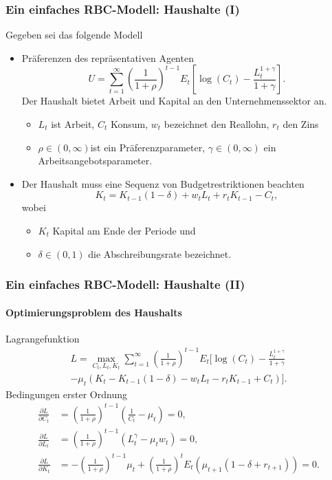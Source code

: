 \documentclass[10pt]{beamer}  %
\begin{document}
\begin{frame}
  \frametitle{Ein einfaches RBC-Modell: Haushalte (I)}
Gegeben sei das folgende Modell
\begin{itemize}
\item Pr\"{a}ferenzen des repr\"{a}sentativen Agenten
\begin{equation*}
U=\sum_{t=1}^{\infty }\left( \frac{1}{1+\rho }\right) ^{t-1}E_{t}\left[ \log
\left( C_{t}\right) -\frac{L_{t}^{1+\gamma }}{1+\gamma }\right] .
\end{equation*}%
Der Haushalt bietet Arbeit und Kapital an den Unternehmenssektor an.
\begin{itemize}
\item $L_{t}$ ist Arbeit, $C_{t}$ Konsum, $w_{t}$ bezeichnet den Reallohn, $r_{t}$ den Zins
\item $\rho \in \left( 0,\infty \right)$ist ein Pr\"{a}ferenzparameter, $\gamma \in \left( 0,\infty \right) $ ein Arbeitsangebotsparameter.
\end{itemize}
\item Der Haushalt muss eine Sequenz von Budgetrestriktionen beachten
\begin{equation*}
K_t=K_{t-1}\left( 1-\delta \right) +w_{t}L_{t}+r_{t}K_{t-1}-C_{t},
\end{equation*}%
wobei
\begin{itemize}
\item $K_{t}$ Kapital am Ende der Periode und
\item $\delta \in \left(
0,1\right) $ die Abschreibungsrate bezeichnet.
\end{itemize}
\end{itemize}
\end{frame}

\begin{frame}\frametitle{Ein einfaches RBC-Modell: Haushalte (II)}
  \framesubtitle{Optimierungsproblem des Haushalts}
  Lagrangefunktion
\begin{multline*}
L = \max_{C_t,L_t,K_t} \sum_{t=1}^\infty \left( \frac{1}{1+\rho }\right) ^{t-1}E_{t}\Big[ \log
\left( C_{t}\right) -\frac{L_{t}^{1+\gamma }}{1+\gamma }\\
-\mu_t\left(K_t-K_{t-1}\left( 1-\delta \right) -w_{t}L_{t}-r_{t}K_{t-1}+C_{t}\right)\Big].
\end{multline*}
Bedingungen erster Ordnung
\begin{align*}
  \frac{\partial L}{\partial C_t} &= \left( \frac{1}{1+\rho }\right) ^{t-1}\left(\frac{1}{C_t}-\mu_t\right) = 0,\\
  \frac{\partial L}{\partial L_t} &= \left( \frac{1}{1+\rho }\right) ^{t-1}\left(L_t^\gamma-\mu_tw_t\right) = 0,\\
  \frac{\partial L}{\partial K_t} &= -\left( \frac{1}{1+\rho }\right) ^{t-1}\mu_t+\left( \frac{1}{1+\rho }\right) ^tE_t\left(\mu_{t+1}(1-\delta+r_{t+1})\right) = 0.
\end{align*}
\end{frame}
\end{document}
